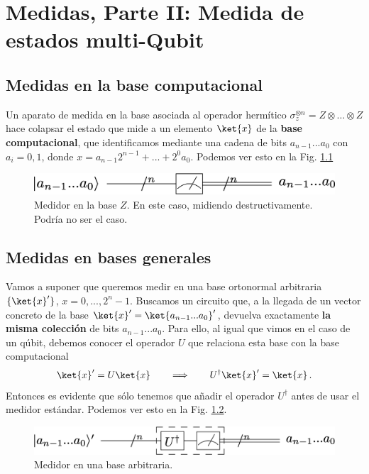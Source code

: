 \documentclass[a4paper,11pt]{book} %
\numberwithin{equation}{chapter}
\begin{document}
\chapter{Medidas, Parte II: Medida de estados multi-Qubit}

	\section{Medidas en la base computacional}

Un aparato de medida en la base asociada al operador hermítico $\sigma_z^{\otimes n} = Z\otimes \ldots \otimes Z$ hace colapsar el estado  que mide a un elemento $\ket{x}$ de la \textbf{base computacional}, que identificamos mediante una cadena de bits $a_{n-1}...a_0$ con $a_i=0,1$,  donde $x= a_{n-1}2^{n-1}+...+2^0 a_0$. Podemos ver esto en la Fig. \ref{Fig_medidas2_Multimeter_zbasis}

	\begin{figure}[H]
	\centering 
	\includegraphics[width=0.5\linewidth]{Figuras/Fig_medidas2_Multimeter_zbasis.png}
	\caption{Medidor en la base $Z$. En este caso, midiendo destructivamente. Podría no ser el caso.}
	\label{Fig_medidas2_Multimeter_zbasis}
	\end{figure}




    \section{Medidas en bases generales}
    
Vamos a suponer que queremos medir en una base ortonormal arbitraria $\{\ket{ x}'\}$, $x=0,...,2^n-1$. Buscamos un circuito que, a la llegada de un vector  concreto de la base $\ket{x}'=\ket{a_{n-1}...a_0}'$, devuelva exactamente \textbf{la misma colección} de bits  $a_{n-1}...a_0$. Para ello, al igual que vimos en el caso de un qúbit, debemos conocer el operador $U$ que relaciona esta base con la base computacional
\begin{equation}
\ket{ x}'= U\ket{x}~~~~~~\Longrightarrow ~~~~~~   U^\dagger\ket{x}' = \ket{ x}  \, .
\end{equation}
Entonces es evidente que sólo tenemos que añadir el operador $U^\dagger$ antes de usar el medidor estándar. Podemos ver esto en la Fig. \ref{Fig_medidas2_Multimeter_basis}. 

	\begin{figure}[H]
	\centering 
	\includegraphics[width=0.6\linewidth]{Figuras/Fig_medidas2_Multimeter_basis.png}
	\caption{Medidor en una base arbitraria.}
	\label{Fig_medidas2_Multimeter_basis}
	\end{figure}
\end{document}
